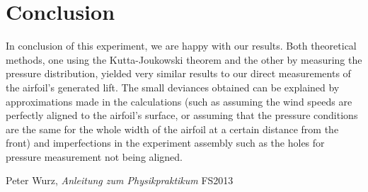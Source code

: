 \documentclass{scrreprt}
\begin{document}
\section{Conclusion}
In conclusion of this experiment, we are happy with our results. Both theoretical methods, one using the Kutta-Joukowski theorem and the other by measuring the pressure distribution, yielded very similar results to our direct measurements of the airfoil's generated lift. The small deviances obtained can be explained by approximations made in the calculations (such as assuming the wind speeds are perfectly aligned to the airfoil's surface, or assuming that the pressure conditions are the same for the whole width of the airfoil at a certain distance from the front) and imperfections in the experiment assembly such as the holes for pressure measurement not being aligned.

\begin{thebibliography}{9}

  Peter Wurz,
  \emph{Anleitung zum Physikpraktikum}
  FS2013

\end{thebibliography}
\end{document}
